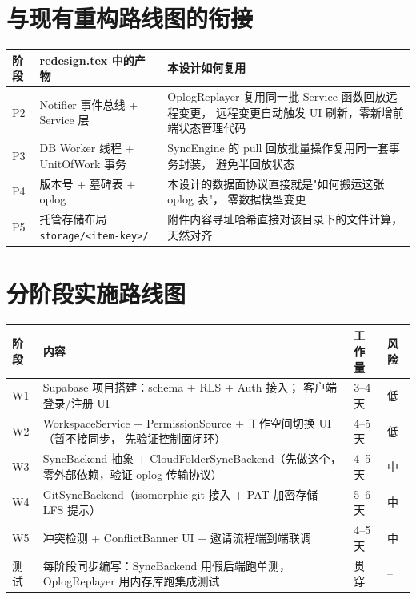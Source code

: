 \documentclass[12pt, a4paper]{article}
\begin{document}
\section{与现有重构路线图的衔接}

\begin{center}
\begin{tabular}{p{2.2cm} p{4.4cm} p{6.1cm}}
  \toprule
  \textbf{阶段} & \textbf{redesign.tex 中的产物} & \textbf{本设计如何复用} \\
  \midrule
  P2 & Notifier 事件总线 + Service 层 & OplogReplayer 复用同一批 Service 函数回放远程变更，
       远程变更自动触发 UI 刷新，零新增前端状态管理代码 \\
  P3 & DB Worker 线程 + UnitOfWork 事务 & SyncEngine 的 pull 回放批量操作复用同一套事务封装，
       避免半回放状态 \\
  P4 & 版本号 + 墓碑表 + oplog & 本设计的数据面协议直接就是"如何搬运这张 oplog 表"，
       零数据模型变更 \\
  P5 & 托管存储布局 \texttt{storage/<item-key>/} & 附件内容寻址哈希直接对该目录下的文件计算，
       天然对齐 \\
  \bottomrule
\end{tabular}
\end{center}

\section{分阶段实施路线图}

\begin{center}
\begin{tabular}{p{1.4cm} p{5.6cm} p{2.4cm} p{2.6cm}}
  \toprule
  \textbf{阶段} & \textbf{内容} & \textbf{工作量} & \textbf{风险} \\
  \midrule
  W1 & Supabase 项目搭建：schema + RLS + Auth 接入；
       客户端登录/注册 UI & 3--4 天 & 低 \\
  W2 & WorkspaceService + PermissionSource + 工作空间切换 UI（暂不接同步，
       先验证控制面闭环） & 4--5 天 & 低 \\
  W3 & SyncBackend 抽象 + CloudFolderSyncBackend（先做这个，
       零外部依赖，验证 oplog 传输协议） & 4--5 天 & 中 \\
  W4 & GitSyncBackend（isomorphic-git 接入 + PAT 加密存储 + LFS 提示） & 5--6 天 & 中 \\
  W5 & 冲突检测 + ConflictBanner UI + 邀请流程端到端联调 & 4--5 天 & 中 \\
  测试 & 每阶段同步编写：SyncBackend 用假后端跑单测，
        OplogReplayer 用内存库跑集成测试 & 贯穿 & -- \\
  \bottomrule
\end{tabular}
\end{center}
\end{document}
